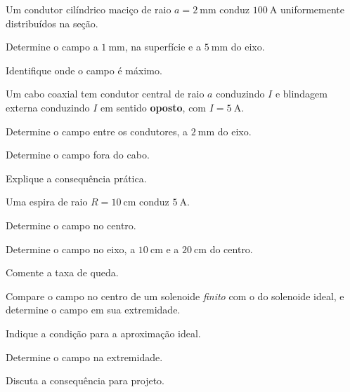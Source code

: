 \blocoaprofundamento
\begin{questao}[3]{}

Um condutor cilíndrico maciço de raio $a=\SI{2}{\milli\meter}$ conduz
$\SI{100}{\ampere}$ uniformemente distribuídos na seção.
\begin{itensq}
\item Determine o campo a $\SI{1}{\milli\meter}$, na superfície e a
      $\SI{5}{\milli\meter}$ do eixo.
\item Identifique onde o campo é máximo.
\end{itensq}


\end{questao}
\begin{questao}[3]{}

Um cabo coaxial tem condutor central de raio $a$ conduzindo $I$ e blindagem
externa conduzindo $I$ em sentido \textbf{oposto}, com $I=\SI{5}{\ampere}$.
\begin{itensq}
\item Determine o campo entre os condutores, a $\SI{2}{\milli\meter}$ do eixo.
\item Determine o campo fora do cabo.
\item Explique a consequência prática.
\end{itensq}


\end{questao}
\begin{questao}[3]{}

Uma espira de raio $R=\SI{10}{\centi\meter}$ conduz $\SI{5}{\ampere}$.
\begin{itensq}
\item Determine o campo no centro.
\item Determine o campo no eixo, a $\SI{10}{\centi\meter}$ e a
      $\SI{20}{\centi\meter}$ do centro.
\item Comente a taxa de queda.
\end{itensq}


\end{questao}
\begin{questao}[3]{}

Compare o campo no centro de um solenoide \emph{finito} com o do solenoide
ideal, e determine o campo em sua extremidade.
\begin{itensq}
\item Indique a condição para a aproximação ideal.
\item Determine o campo na extremidade.
\item Discuta a consequência para projeto.
\end{itensq}


\end{questao}
